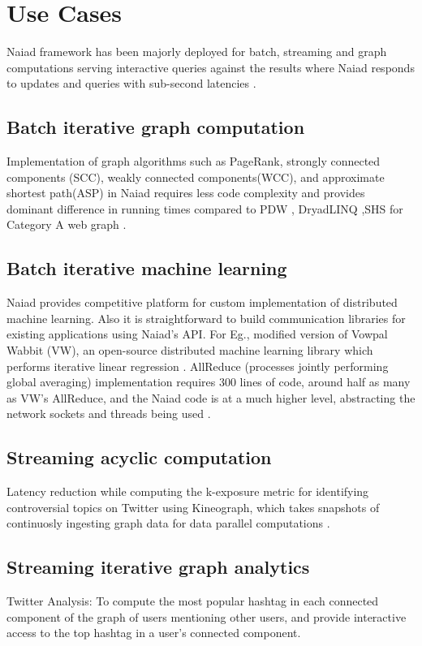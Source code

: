 \documentclass[9pt,twocolumn,twoside]{../../styles/osajnl}
\begin{document}
\section{Use Cases}
Naiad framework has been majorly deployed for batch, streaming and
graph computations serving interactive queries against the results
where Naiad responds to updates and queries with sub-second latencies
\cite{paper1-Naiad}.

\subsection{Batch iterative graph computation}
Implementation of graph algorithms such as PageRank, strongly
connected components (SCC), weakly connected components(WCC), and
approximate shortest path(ASP) in Naiad requires less code complexity
and provides dominant difference in running times compared to PDW
\cite{www-PDW}, DryadLINQ \cite{paper-DryadLINQ},SHS \cite{paper-SHS}
for Category A web graph
\cite{dataset-clueweb09,paper1-Naiad,paper-Largegraphs}.
\subsection{Batch iterative machine learning} Naiad provides competitive platform for custom implementation of distributed machine learning. Also it is straightforward to build communication libraries for existing applications using Naiad’s API. For Eg., modified version of Vowpal Wabbit (VW), an open-source distributed machine learning library which performs iterative linear regression \cite{github-vowpalwabbit}. AllReduce (processes jointly performing global averaging) implementation requires 300 lines of code, around half as many as VW’s AllReduce, and the Naiad code is at a much higher level, abstracting the network sockets and threads being used \cite{paper1-Naiad}.
\subsection{Streaming acyclic computation}
Latency reduction while computing the k-exposure metric for
identifying controversial topics on Twitter using Kineograph, which
takes snapshots of continuosly ingesting graph data for data parallel
computations \cite{paper-Kineograph}.
\subsection{Streaming iterative graph analytics}
Twitter Analysis: To compute the most popular hashtag in each
connected component of the graph of users mentioning other users, and
provide interactive access to the top hashtag in a user’s connected
component.
\end{document}
